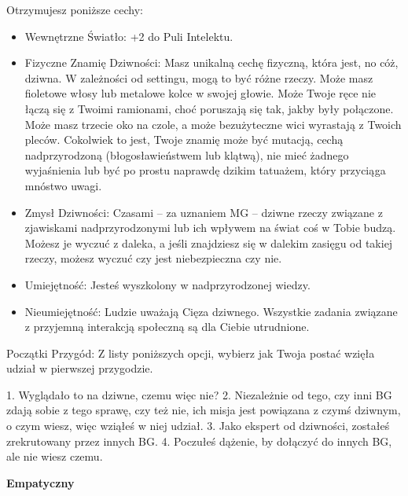 Otrzymujesz poniższe cechy:
\begin{itemize}
\item Wewnętrzne Światło: +2 do Puli Intelektu.
\item Fizyczne Znamię Dziwności: Masz unikalną cechę fizyczną, która jest, no cóż, dziwna. W zależności od settingu, mogą to być różne rzeczy. Może masz fioletowe włosy lub metalowe kolce w swojej głowie. Może Twoje ręce nie łączą się z Twoimi ramionami, choć poruszają się tak, jakby były połączone. Może masz trzecie oko na czole, a może bezużyteczne wici wyrastają z Twoich pleców. Cokolwiek to jest, Twoje znamię może być mutacją, cechą nadprzyrodzoną (błogosławieństwem lub klątwą), nie mieć żadnego wyjaśnienia lub być po prostu naprawdę dzikim tatuażem, który przyciąga mnóstwo uwagi.
\item Zmysł Dziwności: Czasami – za uznaniem MG – dziwne rzeczy związane z zjawiskami nadprzyrodzonymi lub ich wpływem na świat coś w Tobie budzą. Możesz je wyczuć z daleka, a jeśli znajdziesz się w dalekim zasięgu od takiej rzeczy, możesz wyczuć czy jest niebezpieczna czy nie.
\item Umiejętność: Jesteś wyszkolony w nadprzyrodzonej wiedzy.
 \item Nieumiejętność: Ludzie uważają Cięza dziwnego. Wszystkie zadania związane z przyjemną interakcją społeczną są dla Ciebie utrudnione.
\end{itemize}
    
Początki Przygód: Z listy poniższych opcji, wybierz jak Twoja postać wzięła udział w pierwszej przygodzie.

1. Wyglądało to na dziwne, czemu więc nie?
2. Niezależnie od tego, czy inni BG zdają sobie z tego sprawę, czy też nie, ich misja jest powiązana z czymś dziwnym, o czym wiesz, więc wziąłeś w niej udział.
3. Jako ekspert od dziwności, zostałeś zrekrutowany przez innych BG.
4. Poczułeś dążenie, by dołączyć do innych BG, ale nie wiesz czemu.

\textbf{Empatyczny}

